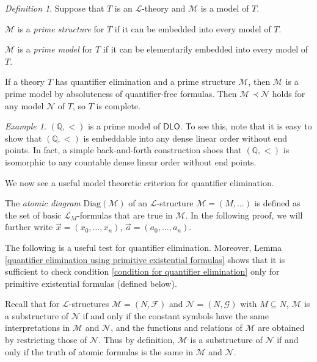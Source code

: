 \documentclass[a4paper, 11pt]{amsart}
\theoremstyle{remark}
\newtheorem{definition}[definition]{Definition}
\newtheorem{example}[example]{Example}
\newcommand{\NN}{\mathbb{N}}
\newcommand{\QQ}{\mathbb{Q}}
\newcommand{\cF}{\mathcal F}
\newcommand{\cG}{\mathcal G}
\newcommand{\cL}{\mathcal L}
\newcommand{\cM}{\mathcal M}
\newcommand{\cN}{\mathcal N}
\newenvironment{enumerate-(a)}{\begin{enumerate}[label={\upshape (\alph*)}, leftmargin=2pc]}{\end{enumerate}}
\begin{document}
\begin{definition} 
Suppose that $T$ is an $\cL$-theory and $\cM$ is a model of $T$. 
\begin{enumerate-(a)} 
\item 
$\cM$ is a \emph{prime structure} for $T$ if it can be embedded into every model of $T$. 
\item 
$\cM$ is a \emph{prime model} for $T$ if it can be elementarily embedded into every model of $T$. 
\end{enumerate-(a)} 
\end{definition} 

If a theory $T$ has quantifier elimination and a prime structure $\cM$, then $\cM$ is a prime model by absoluteness of quantifier-free formulas. 
Then $\cM \prec \cN$ holds for any model $\cN$ of $T$, so $T$ is complete. 

\begin{example} 
$(\QQ,<)$ is a prime model of $\mathsf{DLO}$. 
To see this, note that it is easy to show that $(\QQ,<)$ is embeddable into any dense linear order without end points. 
In fact, a simple back-and-forth construction shoes that $(\QQ,<)$ is isomorphic to any countable dense linear order without end points. 
\end{example} 

We now see a useful model theoretic criterion for quantifier elimination. 

The \emph{atomic diagram} $\mathrm{Diag}(\cM)$ of an $\cL$-structure $\cM=(M,\dots)$ is defined as the set of basic $\cL_M$-formulas that are true in $\cM$. In the following proof, we will further write $\vec{x}=(x_0,\dots,x_n)$, $\vec{a}=(a_0,\dots,a_n)$. 

The following is a useful test for quantifier elimination. 
Moreover, Lemma \ref{quantifier elimination using primitive existential formulas} shows that it is sufficient to check condition \ref{condition for quantifier elimination} only for primitive existential formulas (defined below). 

Recall that for $\cL$-structures $\cM=(N,\cF)$ and $\cN=(N,\cG)$ with $M\subseteq N$, $\cM$ is a substructure of $\cN$ if and only if the constant symbols have the same interpretations in $\cM$ and $\cN$, and the functions and relations of $\cM$ are obtained by restricting those of $\cN$. 
Thus by definition, $\cM$ is a substructure of $\cN$ if and only if the truth of atomic formulas is the same in $\cM$ and $\cN$. 
\end{document}
